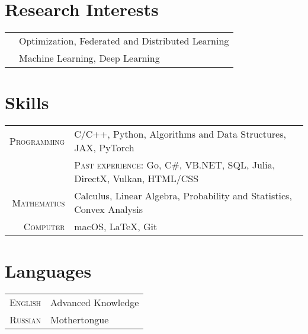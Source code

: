 \section{Research Interests}
\begin{tabular}{cl}
	&  Optimization, Federated and Distributed Learning\\
	&Machine Learning, Deep Learning
\end{tabular}

\section{Skills}

\begin{tabular}{rl}
	\textsc{Programming} & C/C++, Python, Algorithms and Data Structures, JAX, PyTorch\\
	& \textsc{Past experience:} Go, C\#, VB.NET, SQL, Julia, DirectX, Vulkan, HTML/CSS\\
	\textsc{Mathematics} & Calculus, Linear Algebra, Probability and Statistics, Convex Analysis\\
	\textsc{Computer} & macOS, LaTeX, Git\\
\end{tabular}

\section{Languages}

\begin{tabular}{rl}
	\textsc{English} & Advanced Knowledge \\
	\textsc{Russian} & Mothertongue\\
\end{tabular}